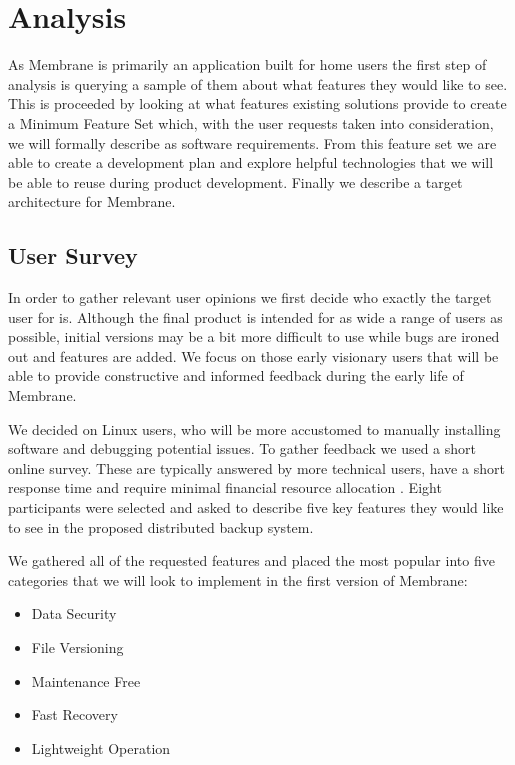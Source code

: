 \documentclass[11pt, a4paper, twoside]{report}
\begin{document}
\chapter{Analysis}

As Membrane is primarily an application built for home users the first step of analysis is querying a sample of them about what features they would like to see. This is proceeded by looking at what features existing solutions provide to create a Minimum Feature Set which, with the user requests taken into consideration, we will formally describe as software requirements. From this feature set we are able to create a development plan and explore helpful technologies that we will be able to reuse during product development. Finally we describe a target architecture for Membrane.

\section{User Survey}

In order to gather relevant user opinions we first decide who exactly the target user for is. Although the final product is intended for as wide a range of users as possible, initial versions may be a bit more difficult to use while bugs are ironed out and features are added. We focus on those early visionary users that will be able to provide constructive and informed feedback during the early life of Membrane. \label{txt:adv-users}

We decided on Linux users, who will be more accustomed to manually installing software and debugging potential issues. To gather feedback we used a short online survey. These are typically answered by more technical users, have a short response time and require minimal financial resource allocation \citep{ilieva2002online}. Eight participants were selected and asked to describe five key features they would like to see in the proposed distributed backup system.

We gathered all of the requested features and placed the most popular into five categories that we will look to implement in the first version of Membrane:

\begin{itemize}
 \item Data Security
 \item File Versioning
 \item Maintenance Free
 \item Fast Recovery
 \item Lightweight Operation
\end{itemize}
\end{document}
